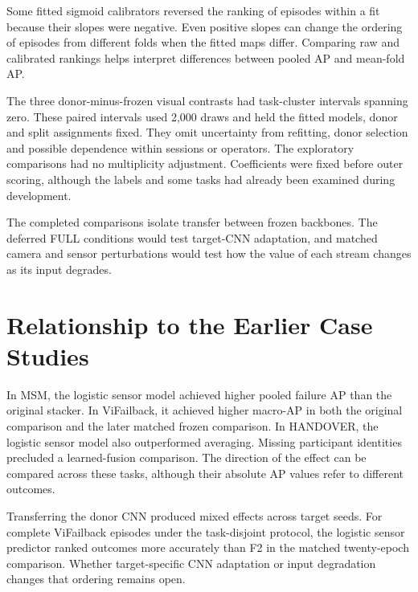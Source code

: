 Some fitted sigmoid calibrators reversed the ranking of episodes within a fit because their slopes were negative. Even positive slopes can change the ordering of episodes from different folds when the fitted maps differ. Comparing raw and calibrated rankings helps interpret differences between pooled AP and mean-fold AP.

The three donor-minus-frozen visual contrasts had task-cluster intervals spanning zero. These paired intervals used 2,000 draws and held the fitted models, donor and split assignments fixed. They omit uncertainty from refitting, donor selection and possible dependence within sessions or operators. The exploratory comparisons had no multiplicity adjustment. Coefficients were fixed before outer scoring, although the labels and some tasks had already been examined during development.

The completed comparisons isolate transfer between frozen backbones. The deferred FULL conditions would test target-CNN adaptation, and matched camera and sensor perturbations would test how the value of each stream changes as its input degrades.

\section{Relationship to the Earlier Case Studies}
In MSM, the logistic sensor model achieved higher pooled failure AP than the original stacker. In ViFailback, it achieved higher macro-AP in both the original comparison and the later matched frozen comparison. In HANDOVER, the logistic sensor model also outperformed averaging. Missing participant identities precluded a learned-fusion comparison. The direction of the effect can be compared across these tasks, although their absolute AP values refer to different outcomes.

Transferring the donor CNN produced mixed effects across target seeds. For complete ViFailback episodes under the task-disjoint protocol, the logistic sensor predictor ranked outcomes more accurately than F2 in the matched twenty-epoch comparison. Whether target-specific CNN adaptation or input degradation changes that ordering remains open.
